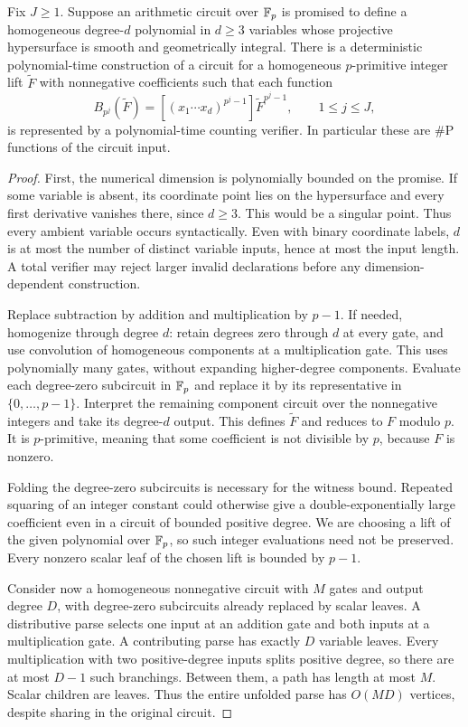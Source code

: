 \begin{lemma}
\label{fg:lem:circuit-coeff}
Fix $J\ge1$. Suppose an arithmetic circuit over $\mathbb F_p$ is promised to
define a homogeneous degree-$d$ polynomial in $d\ge3$ variables whose
projective hypersurface is smooth and geometrically integral.
There is a deterministic polynomial-time construction of a circuit for a
homogeneous $p$-primitive integer lift $\widetilde F$ with nonnegative coefficients
such that each function
\[
 B_{p^j}(\widetilde F)
 =[(x_1\cdots x_d)^{p^j-1}]
       \widetilde F^{p^j-1},\qquad 1\le j\le J,
\]
is represented by a polynomial-time counting verifier. In particular
these are $\#\mathrm P$ functions of the circuit input.
\end{lemma}

\begin{proof}
First, the numerical dimension is polynomially bounded on the promise.
If some variable is absent, its coordinate point lies on the
hypersurface and every first derivative vanishes there, since $d\ge3$.
This would be a singular point. Thus every ambient variable occurs
syntactically. Even with binary coordinate labels, $d$ is at most the
number of distinct variable inputs, hence at most the input length.
A total verifier may reject larger invalid declarations before any
dimension-dependent construction.

Replace subtraction by addition and multiplication by $p-1$. If
needed, homogenize through degree $d$: retain degrees zero through $d$
at every gate, and use convolution of homogeneous components at a
multiplication gate. This uses polynomially many gates, without
expanding higher-degree components. Evaluate each degree-zero
subcircuit in $\mathbb F_p$ and replace it by its representative in
$\{0,\ldots,p-1\}$. Interpret the remaining component circuit over the
nonnegative integers and take its degree-$d$ output. This defines
$\widetilde F$ and reduces to $F$ modulo $p$. It is $p$-primitive, meaning that some coefficient is not divisible by $p$,
because $F$ is nonzero.

Folding the degree-zero subcircuits is necessary for the witness
bound. Repeated squaring of an integer constant could otherwise give
a double-exponentially large coefficient even in a circuit of bounded
positive degree. We are choosing a lift of the given polynomial over
$\mathbb F_p$, so such integer evaluations need not be preserved. Every
nonzero scalar leaf of the chosen lift is bounded by $p-1$.

Consider now a homogeneous nonnegative circuit with $M$ gates and
output degree $D$, with degree-zero subcircuits already replaced by
scalar leaves. A distributive parse selects one input at an addition
gate and both inputs at a multiplication gate. A contributing parse
has exactly $D$ variable leaves. Every multiplication with two
positive-degree inputs splits positive degree, so there are at most
$D-1$ such branchings. Between them, a path has length at most $M$.
Scalar children are leaves. Thus the entire unfolded parse has
$O(MD)$ vertices, despite sharing in the original circuit.


\end{proof}
